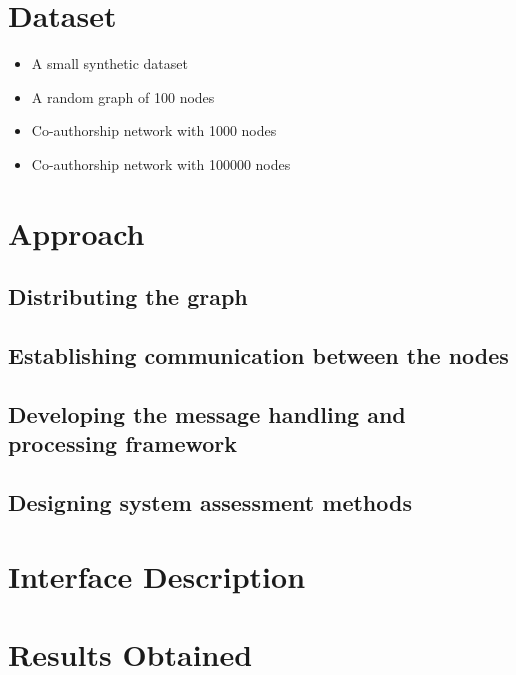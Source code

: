 \documentclass[12pt,a4paper]{article}
\begin{document}
\section{Dataset}
	\begin{itemize}[nolistsep]
		\item A small synthetic dataset
		\item A random graph of 100 nodes
		\item Co-authorship network with 1000 nodes
		\item Co-authorship network with 100000 nodes
	\end{itemize}

\section{Approach}
	\subsection{Distributing the graph}
	\subsection{Establishing communication between the nodes}
	\subsection{Developing the message handling and processing framework}
	\subsection{Designing system assessment methods}
\section{Interface Description}
	 
\section{Results Obtained}
\end{document}

